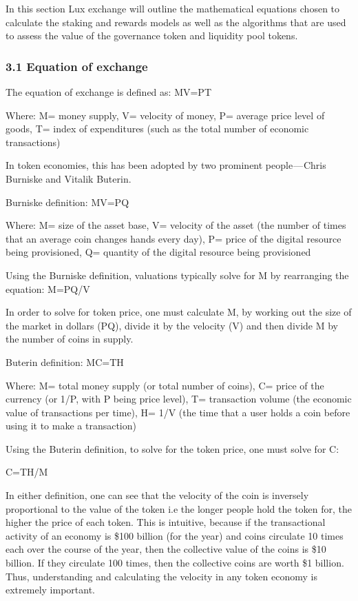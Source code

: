 \documentclass[11pt]{article}
\begin{document}
In this section Lux exchange will outline the mathematical equations chosen to calculate the staking and rewards models as well as the algorithms that are used to assess the value of the governance token and liquidity pool tokens.


\subsubsection{3.1 Equation of exchange}

The equation of exchange is defined as: MV=PT


Where: M= money supply, V= velocity of money, P= average price level of goods, T= index of expenditures (such as the total number of economic transactions)


In token economies, this has been adopted by two prominent people --- Chris Burniske and Vitalik Buterin.


Burniske definition: MV=PQ


Where: M= size of the asset base, V= velocity of the asset (the number of times that an average coin changes hands every day), P= price of the digital resource being provisioned, Q= quantity of the digital resource being provisioned


Using the Burniske definition, valuations typically solve for M by rearranging the equation: M=PQ/V


In order to solve for token price, one must calculate M, by working out the size of the market in dollars (PQ), divide it by the velocity (V) and then divide M by the number of coins in supply.


Buterin definition: MC=TH


Where: M= total money supply (or total number of coins), C= price of the currency (or 1/P, with P being price level), T= transaction volume (the economic value of transactions per time), H= 1/V (the time that a user holds a coin before using it to make a transaction)


Using the Buterin definition, to solve for the token price, one must solve for C:


C=TH/M


In either definition, one can see that the velocity of the coin is inversely proportional to the value of the token i.e the longer people hold the token for, the higher the price of each token. This is intuitive, because if the transactional activity of an economy is \$100 billion (for the year) and coins circulate 10 times each over the course of the year, then the collective value of the coins is \$10 billion. If they circulate 100 times, then the collective coins are worth \$1 billion. Thus, understanding and calculating the velocity in any token economy is extremely important.
\end{document}

